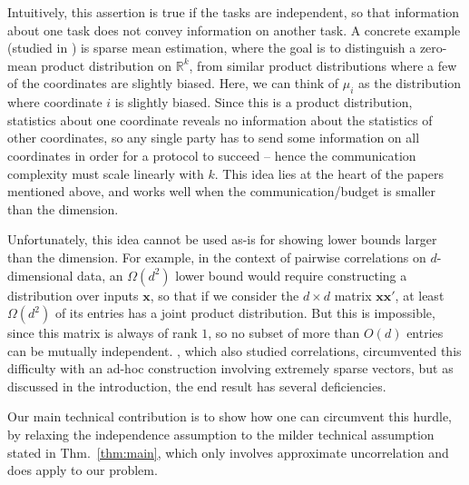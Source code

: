 \documentclass[final, 12pt]{colt2018}
\newcommand{\reals}{\mathbb{R}}
\newcommand{\E}{\mathbb{E}}
\newcommand{\bx}{\mathbf{x}}
\newcommand{\thmref}[1]{Thm.~\ref{#1}}
\begin{document}
Intuitively, this assertion is true if the tasks are independent, so that information about one task does not convey information on another task. 
A concrete example (studied in \cite{shamir2014fundamental,steinhardt2015minimax,braverman2016communication}) is sparse mean estimation, where the goal is to distinguish a zero-mean product distribution on $\reals^k$, from similar product distributions where a few of the coordinates are slightly biased. Here, we can think of $\mu_i$ as the distribution where coordinate $i$ is slightly biased. Since this is a product distribution, statistics about one coordinate reveals no information about the statistics of other coordinates, so any single party has to send some information on all coordinates in order for a protocol to succeed -- hence the communication complexity must scale linearly with $k$. This idea lies at the heart of the papers mentioned above, and works well when the communication/budget is smaller than the dimension.

Unfortunately, this idea cannot be used as-is for showing lower bounds larger than the dimension. For example, in the context of pairwise correlations on $d$-dimensional data, an $\Omega(d^2)$ lower bound would require constructing a distribution over inputs $\bx$, so that if we consider the $d\times d$ matrix $\bx\bx'$, at least $\Omega(d^2)$ of its entries has a joint product distribution. But this is impossible, since this matrix is always of rank $1$, so no subset of more than $O(d)$ entries can be mutually independent. \citet{shamir2014fundamental}, which also studied correlations, circumvented this difficulty with an ad-hoc construction involving extremely sparse vectors, but as discussed in the introduction, the end result has several deficiencies. 

Our main technical contribution is to show how one can circumvent this hurdle, by relaxing the independence assumption to the milder technical assumption stated in \thmref{thm:main}, which only involves approximate uncorrelation and does apply to our problem. 
\end{document}
